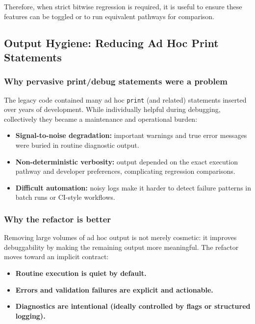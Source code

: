 \documentclass[11pt]{scrartcl}
\begin{document}
Therefore, when strict bitwise regression is required, it is useful to ensure these features
can be toggled or to run equivalent pathways for comparison.

\subsection{Output Hygiene: Reducing Ad Hoc Print Statements}

\subsubsection{Why pervasive print/debug statements were a problem}

The legacy code contained many ad hoc \texttt{print} (and related) statements inserted over
years of development. While individually helpful during debugging, collectively they became a
maintenance and operational burden:

\begin{itemize}
\item \textbf{Signal-to-noise degradation:} important warnings and true error messages were
      buried in routine diagnostic output.
\item \textbf{Non-deterministic verbosity:} output depended on the exact execution pathway
      and developer preferences, complicating regression comparisons.
\item \textbf{Difficult automation:} noisy logs make it harder to detect failure patterns
      in batch runs or CI-style workflows.
\end{itemize}

\subsubsection{Why the refactor is better}

Removing large volumes of ad hoc output is not merely cosmetic: it improves debuggability by
making the remaining output more meaningful. The refactor moves toward an implicit contract:

\begin{itemize}
\item \textbf{Routine execution is quiet by default.}
\item \textbf{Errors and validation failures are explicit and actionable.}
\item \textbf{Diagnostics are intentional (ideally controlled by flags or structured logging).}
\end{itemize}
\end{document}
